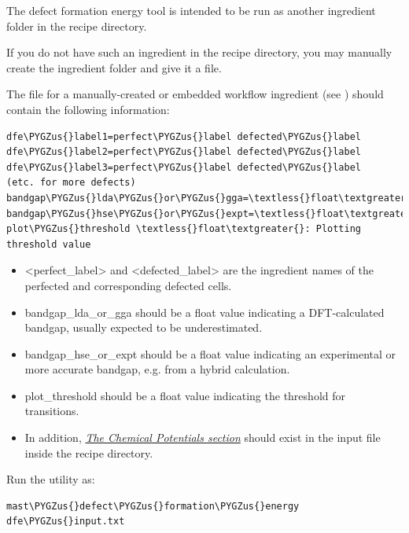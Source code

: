 \documentclass[letterpaper,10pt,english]{sphinxmanual}
\def\PYGZus{\char`\_}
\begin{document}
The defect formation energy tool is intended to be run as another ingredient folder in the recipe directory.

If you do not have such an ingredient in the recipe directory, you may manually create the ingredient folder and give it a  file.

The  file for a manually-created or embedded workflow ingredient (see ) should contain the following information:

\begin{Verbatim}[commandchars=\\\{\}]
dfe\PYGZus{}label1=perfect\PYGZus{}label defected\PYGZus{}label
dfe\PYGZus{}label2=perfect\PYGZus{}label defected\PYGZus{}label
dfe\PYGZus{}label3=perfect\PYGZus{}label defected\PYGZus{}label
(etc. for more defects)
bandgap\PYGZus{}lda\PYGZus{}or\PYGZus{}gga=\textless{}float\textgreater{}
bandgap\PYGZus{}hse\PYGZus{}or\PYGZus{}expt=\textless{}float\textgreater{}
plot\PYGZus{}threshold \textless{}float\textgreater{}: Plotting threshold value
\end{Verbatim}
\begin{itemize}
\item {} 
\textless{}perfect\_label\textgreater{} and \textless{}defected\_label\textgreater{} are the ingredient names of the perfected and corresponding defected cells.

\item {} 
bandgap\_lda\_or\_gga should be a float value indicating a DFT-calculated bandgap, usually expected to be underestimated.

\item {} 
bandgap\_hse\_or\_expt should be a float value indicating an experimental or more accurate bandgap, e.g. from a hybrid calculation.

\item {} 
plot\_threshold should be a float value indicating the threshold for transitions.

\item {} 
In addition, {\hyperref[3_1_7_chemicalpotentials::doc]{\emph{The Chemical Potentials section}}} should exist in the  input file inside the recipe directory.

\end{itemize}

Run the utility as:

\begin{Verbatim}[commandchars=\\\{\}]
mast\PYGZus{}defect\PYGZus{}formation\PYGZus{}energy dfe\PYGZus{}input.txt
\end{Verbatim}
\end{document}

